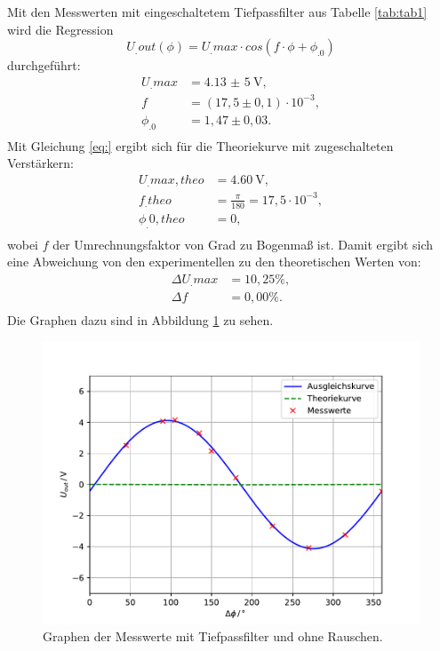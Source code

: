 \noindent Mit den Messwerten mit eingeschaltetem Tiefpassfilter aus Tabelle \ref{tab:tab1} wird die Regression
\begin{equation}
U_.{out}(\phi) = U_.{max}\cdot cos(f\cdot\phi+\phi_.0)\label{eq:Reg}
\end{equation}
durchgeführt:
\begin{align*}
U_.{max} &= \SI{4,13(5)}{\volt}, \\
f 		 &= (17,5\pm0,1)\cdot 10^{-3}, \\
\phi_.0  &= 1,47 \pm0,03 \text{.}\\
\end{align*}
Mit Gleichung \eqref{eq:} ergibt sich für die Theoriekurve mit zugeschalteten Verstärkern:
\begin{align*}
U_.{max,theo} &= \SI{4,60}{\volt}, \\
f_.{theo}	  &= \frac{\pi}{180} = 17,5 \cdot 10^{-3}, \\
\phi_.{0,theo}&= 0, \\
\end{align*}
wobei $f$ der Umrechnungsfaktor von Grad zu Bogenmaß ist.
Damit ergibt sich eine Abweichung von den experimentellen zu den theoretischen Werten von:
\begin{align*}
\Delta U_.{max} &= 10,25\% ,\\
\Delta f		&= 0,00\% \text{.}\\
\end{align*}
Die Graphen dazu sind in Abbildung \ref{fig:U2} zu sehen.

\begin{figure}
\centering
\includegraphics[width=\linewidth-75pt,height=\textheight-75pt,keepaspectratio]{content/images/plot.pdf}
\caption{Graphen der Messwerte mit Tiefpassfilter und ohne Rauschen.}
\label{fig:U2}
\end{figure}


